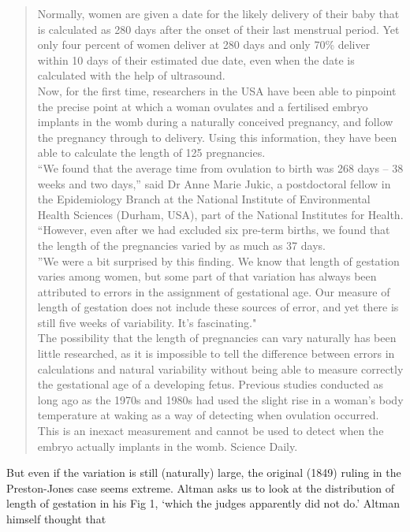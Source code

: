 \documentclass[]{book}
\begin{document}
\begin{quote}
Normally, women are given a date for the likely delivery of their baby that is calculated as 280 days after the onset of their last menstrual period. Yet only four percent of women deliver at 280 days and only 70\% deliver within 10 days of their estimated due date, even when the date is calculated with the help of ultrasound.\\
Now, for the first time, researchers in the USA have been able to pinpoint the precise point at which a woman ovulates and a fertilised embryo implants in the womb during a naturally conceived pregnancy, and follow the pregnancy through to delivery. Using this information, they have been able to calculate the length of 125 pregnancies.\\
``We found that the average time from ovulation to birth was 268 days -- 38 weeks and two days,'' said Dr Anne Marie Jukic, a postdoctoral fellow in the Epidemiology Branch at the National Institute of Environmental Health Sciences (Durham, USA), part of the National Institutes for Health. ``However, even after we had excluded six pre-term births, we found that the length of the pregnancies varied by as much as 37 days.\\
''We were a bit surprised by this finding. We know that length of gestation varies among women, but some part of that variation has always been attributed to errors in the assignment of gestational age. Our measure of length of gestation does not include these sources of error, and yet there is still five weeks of variability. It's fascinating."\\
The possibility that the length of pregnancies can vary naturally has been little researched, as it is impossible to tell the difference between errors in calculations and natural variability without being able to measure correctly the gestational age of a developing fetus. Previous studies conducted as long ago as the 1970s and 1980s had used the slight rise in a woman's body temperature at waking as a way of detecting when ovulation occurred. This is an inexact measurement and cannot be used to detect when the embryo actually implants in the womb. Science Daily.
\end{quote}

But even if the variation is still (naturally) large, the original (1849) ruling in the Preston-Jones case seems extreme. Altman asks us to look at the distribution of length of gestation in his Fig 1, `which the judges apparently did not do.' Altman himself thought that
\end{document}
